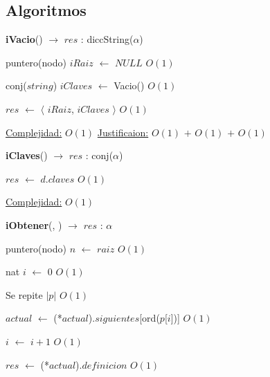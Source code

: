 \begin{Algoritmos}
\subsection{Algoritmos}  
  
\begin{algorithm}[H]
{\textbf{iVacio}() $\to$ $res$ : diccString($\alpha$)}
\begin{algorithmic}[1]

\State puntero(nodo) $iRaiz$ $\gets $ $NULL$  \Comment $O(1)$
 
\State conj($string$) $iClaves$ $\gets$ Vacio() \Comment $O(1)$

\State $res$ $\gets$  $\langle$ $iRaiz$, $iClaves$ $\rangle$ \Comment $O(1)$

\medskip
\State \underline{Complejidad:} $O(1)$
\State \underline{Justificaion:} $O(1)$ $+$ $O(1)$ $+$ $O(1)$

\end{algorithmic}
\end{algorithm}  

\begin{algorithm}[H]
{\textbf{iClaves}(}) $\to$ $res$ : conj($\alpha$)
\begin{algorithmic}[1]

\State $res$ $\gets$ $d$.$claves$ \Comment $O(1)$

\medskip
\State \underline{Complejidad:} $O(1)$

\end{algorithmic}
\end{algorithm}
  
  
  
\begin{algorithm}[H]
{\textbf{iObtener}(, }) $\to$ $res$ : $\alpha$
\begin{algorithmic}[1]

\State puntero(nodo) $n$ $\gets$ $raiz$ \Comment $O(1)$

\State nat $i$ $\gets$ $0$ \Comment $O(1)$


   \Comment Se repite $|p|$ $O(1)$
		

	\State $actual$ $\gets$ (*$actual$).$siguientes$[ord($p$[$i$])] \Comment $O(1)$

	\State $i$ $\gets$ $i + 1$ \Comment $O(1)$
\EndWhile 


\State $res$ $\gets$ (*$actual$).$definicion$ \Comment $O(1)$ 


\end{algorithmic}
\end{algorithm}
\end{Algoritmos}
